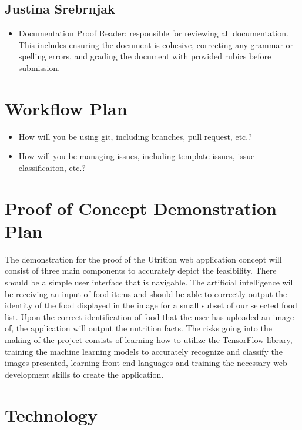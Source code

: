 \documentclass{article}
\begin{document}
\subsection{Justina Srebrnjak}

\begin{itemize}
	\item Documentation Proof Reader: responsible for reviewing all documentation. This includes ensuring the document is cohesive, correcting any grammar or spelling errors, and grading the document with provided rubics before submission.   
\end{itemize}

\section{Workflow Plan}

\begin{itemize}
	\item How will you be using git, including branches, pull request, etc.?
	\item How will you be managing issues, including template issues, issue
	classificaiton, etc.?
\end{itemize}

\section{Proof of Concept Demonstration Plan}

The demonstration for the proof of the Utrition web application concept will consist of three main components to accurately depict the feasibility. There should be a simple user interface that is navigable. The artificial intelligence will be receiving an input of food items and should be able to correctly output the identity of the food displayed in the image for a small subset of our selected food list. Upon the correct identification of food that the user has uploaded an image of, the application will output the nutrition facts. The risks going into the making of the project consists of learning how to utilize the TensorFlow library, training the machine learning models to accurately recognize and classify the images presented, learning front end languages and training the necessary web development skills to create the application.

\section{Technology}
\end{document}
